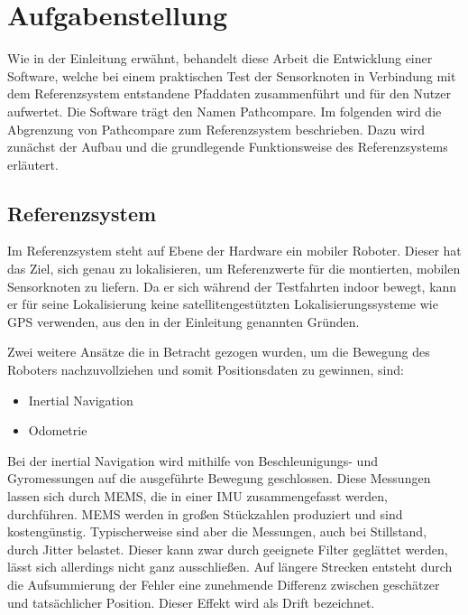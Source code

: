 \section{Aufgabenstellung}
\label{sec:aufgabenstellung}

Wie in der Einleitung erwähnt, behandelt diese Arbeit die Entwicklung einer
Software, welche bei einem praktischen Test der Sensorknoten in Verbindung mit
dem Referenzsystem entstandene Pfaddaten zusammenführt und für den Nutzer
aufwertet. Die Software trägt den Namen Pathcompare.
Im folgenden wird die Abgrenzung von Pathcompare zum 
Referenzsystem beschrieben. Dazu wird zunächst der Aufbau und die grundlegende
Funktionsweise des Referenzsystems erläutert.

\subsection{Referenzsystem}
\label{sub:roboter}

Im Referenzsystem steht auf Ebene der Hardware ein mobiler Roboter. Dieser hat
das Ziel, sich genau zu lokalisieren, um Referenzwerte für die montierten,
mobilen Sensorknoten zu liefern. Da er sich während der Testfahrten indoor
bewegt, kann er für seine Lokalisierung keine satellitengestützten
Lokalisierungssysteme wie GPS verwenden, aus den in der Einleitung genannten
Gründen. 

Zwei weitere Ansätze die in Betracht gezogen wurden, um die Bewegung
des Roboters nachzuvollziehen und somit Positionsdaten zu gewinnen, sind:

\begin{itemize}
  \item Inertial Navigation
  \item Odometrie
\end{itemize}

Bei der inertial Navigation wird mithilfe von Beschleunigungs- und
Gyromessungen auf die ausgeführte Bewegung geschlossen. Diese Messungen lassen
sich durch \gls{MEMS}, die in einer 
\gls{IMU} zusammengefasst werden, durchführen.
MEMS werden in großen Stückzahlen produziert und sind kostengünstig.
Typischerweise sind aber die Messungen, auch bei Stillstand, durch Jitter belastet.
Dieser kann zwar durch geeignete Filter geglättet werden, lässt sich allerdings
nicht ganz ausschließen. Auf längere Strecken entsteht durch die Aufsummierung
der Fehler eine zunehmende Differenz zwischen geschätzer und tatsächlicher
Position. Dieser Effekt wird als Drift bezeichnet.

